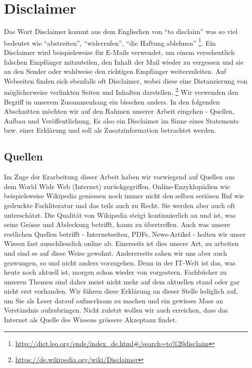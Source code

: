 \section{Disclaimer}
Das Wort Disclaimer kommt aus dem Englischen von ``to disclaim'' was so viel bedeutet wie ``abstreiten'', ``widerrufen'', ``die Haftung ablehnen''
\footnote{\url{http://dict.leo.org/ende/index_de.html\#/search=to\%20disclaim}}.
Ein Disclaimer wird beispielsweise für E-Mails verwendet, um einem versehentlich falschen Empfänger mitzuteilen, den Inhalt der Mail wieder zu vergessen und sie an den Sender oder wahlweise den richtigen Empfänger weiterzuleiten. Auf Webseiten finden sich ebenfalls oft Disclaimer, wobei diese eine Distanzierung von möglicherweise verlinkten Seiten und Inhalten darstellen.
\footnote{\url{https://de.wikipedia.org/wiki/Disclaimer}}
Wir verwenden den Begriff in unserem Zusammenhang ein bisschen anders. In den folgenden Abschnitten möchten wir auf den Rahmen unserer Arbeit eingehen - Quellen, Aufbau und Veröffentlichung. Es also ein Disclaimer im Sinne eines Statements bzw. einer Erklärung und soll als Zusatzinformation betrachtet werden.

\subsection{Quellen}
Im Zuge der Erarbeitung dieser Arbeit haben wir vorwiegend auf Quellen aus dem World Wide Web (Internet) zurückgegriffen. Online-Enzyklopädien wie beispielsweise Wikipedia geniessen noch immer nicht den selben seriösen Ruf wie gedruckte Fachliteratur und das teils auch zu Recht. Sie werden aber auch oft unterschätzt. Die Qualität von Wikipedia steigt kontinuierlich an und ist, was seine Grösse und Abdeckung betrifft, kaum zu übertreffen. Auch was unsere restlichen Quellen betrifft - Internetseiten, PDFs, News-Artikel - holten wir unser Wissen fast ausschliesslich online ab. Einerseits ist dies unsere Art, zu arbeiten und sind es auf diese Weise gewohnt. Andererseits sahen wir uns aber auch gezwungen, so und nicht anders vorzugehen. Denn in der IT-Welt ist das, was heute noch aktuell ist, morgen schon wieder von vorgestern. Fachbücher zu unseren Themen sind daher meist nicht mehr auf dem aktuellen stand oder gar nicht erst vorhanden. Wir führen diese Erklärung an dieser Stelle lediglich auf, um Sie als Leser darauf aufmerksam zu machen und ein gewisses Mass an Verständnis aufzubringen. Nicht zuletzt wollen wir auch erreichen, dass das Internet als Quelle des Wissens grössere Akzeptanz findet.

